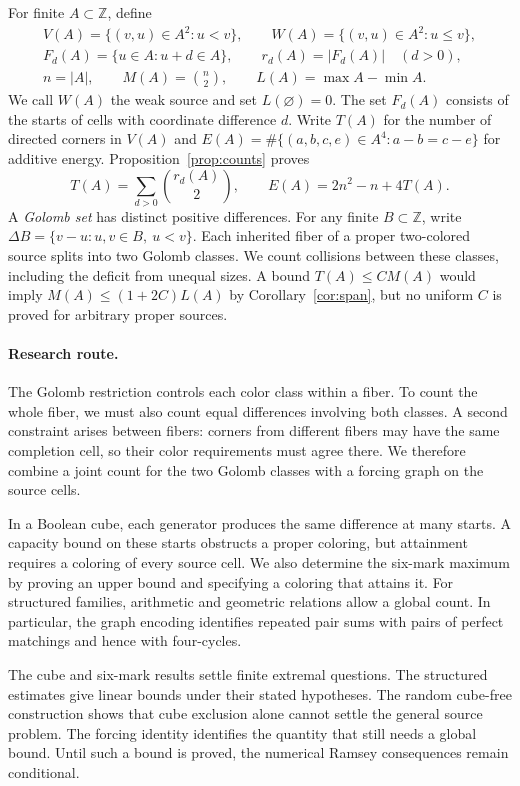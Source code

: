 \documentclass[11pt,a4paper]{article}
\newif\ifshowrevisions
\newenvironment{revision}{\par\begingroup\ifshowrevisions\color{red}\fi}{\par\endgroup}
\theoremstyle{definition}
\newcommand{\Z}{\mathbb Z}
\numberwithin{equation}{section}
\begin{document}
For finite $A\subset\Z$, define
\begin{equation}\label{eq:source-notation}
\begin{gathered}
 V(A)=\{(v,u)\in A^2:u<v\},\qquad W(A)=\{(v,u)\in A^2:u\le v\},\\
 F_d(A)=\{u\in A:u+d\in A\},\qquad r_d(A)=|F_d(A)|\quad(d>0),\\
 n=|A|,\qquad M(A)=\binom n2,\qquad L(A)=\max A-\min A.
\end{gathered}
\end{equation}
We call $W(A)$ the weak source and set $L(\varnothing)=0$. The set $F_d(A)$ consists of the starts of cells with coordinate difference $d$. Write $T(A)$ for the number of directed corners in $V(A)$ and
$E(A)=\#\{(a,b,c,e)\in A^4:a-b=c-e\}$ for additive energy. Proposition~\ref{prop:counts} proves
\begin{equation}\label{eq:intro-counts}
 T(A)=\sum_{d>0}\binom{r_d(A)}2,
 \qquad E(A)=2n^2-n+4T(A).
\end{equation}
A \emph{Golomb set} has distinct positive differences. For any finite $B\subset\Z$, write $\Delta B=\{v-u:u,v\in B,\ u<v\}$. Each inherited fiber of a proper two-colored source splits into two Golomb classes. We count collisions between these classes, including the deficit from unequal sizes. A bound $T(A)\le CM(A)$ would imply $M(A)\le(1+2C)L(A)$ by Corollary~\ref{cor:span}, but no uniform $C$ is proved for arbitrary proper sources.

\begin{revision}
\paragraph{Research route.}
The Golomb restriction controls each color class within a fiber. To count the whole fiber, we must also count equal differences involving both classes. A second constraint arises between fibers: corners from different fibers may have the same completion cell, so their color requirements must agree there. We therefore combine a joint count for the two Golomb classes with a forcing graph on the source cells.

In a Boolean cube, each generator produces the same difference at many starts. A capacity bound on these starts obstructs a proper coloring, but attainment requires a coloring of every source cell. We also determine the six-mark maximum by proving an upper bound and specifying a coloring that attains it. For structured families, arithmetic and geometric relations allow a global count. In particular, the graph encoding identifies repeated pair sums with pairs of perfect matchings and hence with four-cycles.

The cube and six-mark results settle finite extremal questions. The structured estimates give linear bounds under their stated hypotheses. The random cube-free construction shows that cube exclusion alone cannot settle the general source problem. The forcing identity identifies the quantity that still needs a global bound. Until such a bound is proved, the numerical Ramsey consequences remain conditional.
\end{revision}
\end{document}
